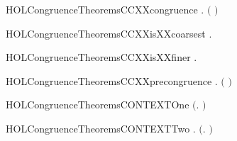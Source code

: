 \begin{SaveVerbatim}{HOLCongruenceTheoremsCCXXcongruence}
\HOLTokenTurnstile{} \HOLSymConst{\HOLTokenForall{}}.   \HOLSymConst{\HOLTokenImp{}}  \ensuremath{(} \ensuremath{)}
\end{SaveVerbatim}
\newcommand{\HOLCongruenceTheoremsCCXXcongruence}{\UseVerbatim{HOLCongruenceTheoremsCCXXcongruence}}
\begin{SaveVerbatim}{HOLCongruenceTheoremsCCXXisXXcoarsest}
\HOLTokenTurnstile{} \HOLSymConst{\HOLTokenForall{}} .   \HOLSymConst{\HOLTokenConj{}}    \HOLSymConst{\HOLTokenImp{}}    
\end{SaveVerbatim}
\newcommand{\HOLCongruenceTheoremsCCXXisXXcoarsest}{\UseVerbatim{HOLCongruenceTheoremsCCXXisXXcoarsest}}
\begin{SaveVerbatim}{HOLCongruenceTheoremsCCXXisXXfiner}
\HOLTokenTurnstile{} \HOLSymConst{\HOLTokenForall{}}.    
\end{SaveVerbatim}
\newcommand{\HOLCongruenceTheoremsCCXXisXXfiner}{\UseVerbatim{HOLCongruenceTheoremsCCXXisXXfiner}}
\begin{SaveVerbatim}{HOLCongruenceTheoremsCCXXprecongruence}
\HOLTokenTurnstile{} \HOLSymConst{\HOLTokenForall{}}.   \HOLSymConst{\HOLTokenImp{}}  \ensuremath{(} \ensuremath{)}
\end{SaveVerbatim}
\newcommand{\HOLCongruenceTheoremsCCXXprecongruence}{\UseVerbatim{HOLCongruenceTheoremsCCXXprecongruence}}
\begin{SaveVerbatim}{HOLCongruenceTheoremsCONTEXTOne}
\HOLTokenTurnstile{}  \ensuremath{(}\HOLTokenLambda{}. \ensuremath{)}
\end{SaveVerbatim}
\newcommand{\HOLCongruenceTheoremsCONTEXTOne}{\UseVerbatim{HOLCongruenceTheoremsCONTEXTOne}}
\begin{SaveVerbatim}{HOLCongruenceTheoremsCONTEXTTwo}
\HOLTokenTurnstile{} \HOLSymConst{\HOLTokenForall{}}.  \ensuremath{(}\HOLTokenLambda{}. \ensuremath{)}
\end{SaveVerbatim}
